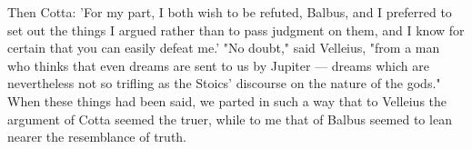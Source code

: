  Then Cotta: 'For my part, I both wish to be refuted, Balbus, and I preferred to set out the things I argued rather than to pass judgment on them, and I know for certain that you can easily defeat me.' "No doubt," said Velleius, "from a man who thinks that even dreams are sent to us by Jupiter — dreams which are nevertheless not so trifling as the Stoics' discourse on the nature of the gods." When these things had been said, we parted in such a way that to Velleius the argument of Cotta seemed the truer, while to me that of Balbus seemed to lean nearer the resemblance of truth.
